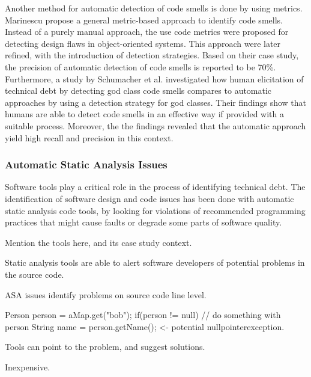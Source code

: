 Another method for automatic detection of code smells is done by using metrics. Marinescu\cite{marinescu2001detecting} propose a general metric-based approach to identify code smells. Instead of a purely manual approach, the use code metrics were proposed for detecting design flaws in object-oriented systems. This approach were later refined, with the introduction of detection strategies\cite{marinescu2004detection}. Based on their case study, the precision of automatic detection of code smells is reported to be 70\%. Furthermore, a study by Schumacher et al.\cite{schumacher2010building} investigated how human elicitation of technical debt by detecting god class code smells compares to automatic approaches by using a detection strategy for god classes. Their findings show that humans are able to detect code smells in an effective way if provided with a suitable process. Moreover, the the findings revealed that the automatic approach yield high recall and precision in this context. 



\subsubsection{Automatic Static Analysis Issues}
Software tools play a critical role in the process of identifying technical debt. The identification of software design and code issues has been done with automatic static analysis code tools, by looking for violations of recommended programming practices that might cause faults or degrade some parts of software quality. 

Mention the tools here, and its case study context.


Static analysis tools are able to alert software developers of potential problems in the source code. 
 
 ASA issues identify problems on source code line level.

 Person person = aMap.get("bob");
 if(person != null) {
 	// do something with person
 }
 String name = person.getName(); <- potential nullpointerexception. 

 Tools can point to the problem, and suggest solutions. 

 Inexpensive.



